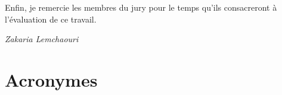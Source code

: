 \documentclass[12pt, a4paper]{report}
\begin{document}
\vspace{0.6cm}

Enfin, je remercie les membres du jury pour le temps qu'ils consacreront
à l'évaluation de ce travail.

\vspace{1.5cm}

\begin{flushright}
\itshape Zakaria Lemchaouri\\
\end{flushright}

\cleardoublepage

\setcounter{page}{1}
\tableofcontents
\cleardoublepage

\listoffigures
{}
\cleardoublepage

\listoftables
{}
\cleardoublepage

\chapter*{Acronymes}

\vspace{0.5cm}
\end{document}
